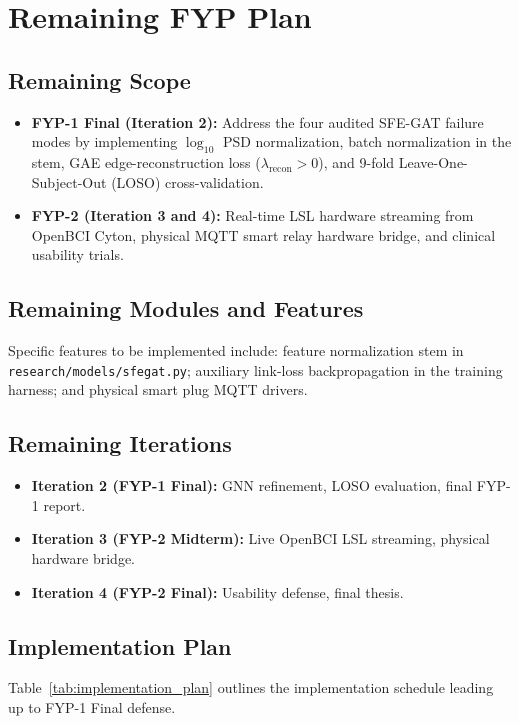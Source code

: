 \documentclass[12pt,a4paper]{report}
\begin{document}
\chapter{Remaining FYP Plan}

\section{Remaining Scope}
\begin{itemize}[leftmargin=1.5em]
    \item \textbf{FYP-1 Final (Iteration 2):} Address the four audited SFE-GAT failure modes by implementing $\log_{10}$ PSD normalization, batch normalization in the stem, GAE edge-reconstruction loss ($\lambda_{\mathrm{recon}} > 0$), and 9-fold Leave-One-Subject-Out (LOSO) cross-validation.
    \item \textbf{FYP-2 (Iteration 3 and 4):} Real-time LSL hardware streaming from OpenBCI Cyton, physical MQTT smart relay hardware bridge, and clinical usability trials.
\end{itemize}

\section{Remaining Modules and Features}
Specific features to be implemented include: feature normalization stem in \texttt{research/models/sfegat.py}; auxiliary link-loss backpropagation in the training harness; and physical smart plug MQTT drivers.

\section{Remaining Iterations}
\begin{itemize}[leftmargin=1.5em]
    \item \textbf{Iteration 2 (FYP-1 Final):} GNN refinement, LOSO evaluation, final FYP-1 report.
    \item \textbf{Iteration 3 (FYP-2 Midterm):} Live OpenBCI LSL streaming, physical hardware bridge.
    \item \textbf{Iteration 4 (FYP-2 Final):} Usability defense, final thesis.
\end{itemize}

\section{Implementation Plan}
Table~\ref{tab:implementation_plan} outlines the implementation schedule leading up to FYP-1 Final defense.
\end{document}
